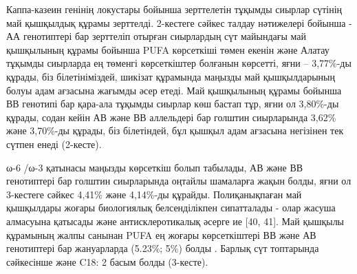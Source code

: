 \begin{multicols}{2}
Каппа-казеин генінің локустары бойынша зерттелетін тұқымды сиырлар
сүтінің май қышқылдық құрамы зерттелді. 2-кестеге сәйкес талдау
нәтижелері бойынша - АА генотиптері бар зерттеліп отырған сиырлардың сүт
майындағы май қышқылының құрамы бойынша PUFA көрсеткіші төмен екенін
және Алатау тұқымды сиырларда ең төменгі көрсеткіштер болғанын көрсетті,
яғни -- 3,77\%-ды құрады, біз білетініміздей, шикізат құрамында маңызды
май қышқылдарының болуы адам ағзасына жағымды әсер етеді. Май қышқылының
құрамы бойынша ВВ генотипі бар қара-ала тұқымды сиырлар көш бастап тұр,
яғни ол 3,80\%-ды құрады, содан кейін АВ және ВВ аллельдері бар голштин
сиырларында 3,62\% және 3,70\%-ды құрады, біз білетіндей, бұл қышқыл
адам ағзасына негізінен тек сүтпен енеді (2-кесте).

ω-6 /ω-3 қатынасы маңызды көрсеткіш болып табылады, АВ және ВВ
генотиптері бар голштин сиырларында оңтайлы шамаларға жақын болды, яғни
ол 3-кестеге сәйкес 4,41\% және 4,14\%-ды құрайды. Полиқанықпаған май
қышқылдары жоғары биологиялық белсенділікпен сипатталады - олар жасуша
алмасуына қатысады және антисклеротикалық әсерге ие {[}40, 41{]}. Май
қышқылы құрамының жалпы санынан PUFA ең жоғары көрсеткіштері ВВ және АВ
генотиптері бар жануарларда (5.23\%; 5\%) болды . Барлық сүт топтарында
сәйкесінше және C18: 2 басым болды (3-кесте).
\end{multicols}

